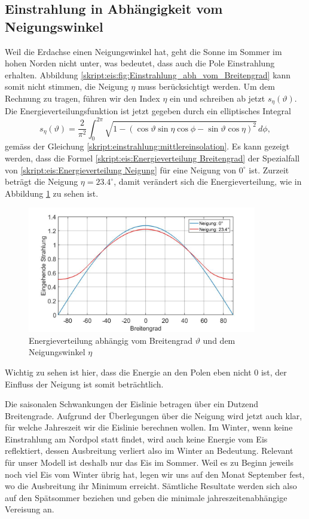 \begin{refsection}
\subsection{Einstrahlung in Abhängigkeit vom Neigungswinkel}
Weil die Erdachse einen Neigungswinkel hat, geht die Sonne im Sommer im hohen Norden nicht unter, was bedeutet, dass auch die Pole Einstrahlung erhalten. Abbildung \ref{skript:eis:fig:Einstrahlung_abh_vom_Breitengrad} kann somit nicht stimmen, die Neigung $\eta$ muss berücksichtigt werden. Um dem Rechnung zu tragen, führen wir den Index $\eta$ ein und schreiben ab jetzt $s_{\eta}(\vartheta)$. Die Energieverteilungsfunktion ist jetzt gegeben durch ein elliptisches Integral
\begin{equation}\label{skript:eis:Energieverteilung Neigung}
s_{\eta}(\vartheta)
=
\frac{2}{\pi^2}\int_{0}^{2\pi}\sqrt{1-(\cos\vartheta\sin\eta \cos\phi-\sin\vartheta \cos\eta)^2}\,d\phi,
\end{equation}
gemäss der Gleichung \eqref{skript:einstrahlung:mittlereinsolation}. Es kann gezeigt werden, dass die Formel \eqref{skript:eis:Energieverteilung Breitengrad} der Spezialfall von \eqref{skript:eis:Energieverteilung Neigung} für eine Neigung von $0^{\circ}$ ist. Zurzeit beträgt die Neigung $\eta=23.4^{\circ}$, damit verändert sich die Energieverteilung, wie in Abbildung \ref{skript:eis:fig:Einstrahlung_abh_mit_und_ohne_Neigung} zu sehen ist.
\begin{figure}
	\centering
	\includegraphics[width=10cm]{eis/Einstrahlung_abh_mit_und_ohne_Neigung.jpg}
	\caption{Energieverteilung abhängig vom Breitengrad $\vartheta$ und dem Neigungswinkel $\eta$}
	\label{skript:eis:fig:Einstrahlung_abh_mit_und_ohne_Neigung}
\end{figure}
Wichtig zu sehen ist hier, dass die Energie an den Polen eben nicht $0$ ist, der Einfluss der Neigung ist somit beträchtlich.

Die saisonalen Schwankungen der Eislinie betragen über ein Dutzend Breitengrade. Aufgrund der Überlegungen über die Neigung wird jetzt auch klar, für welche Jahreszeit wir die Eislinie berechnen wollen. Im Winter, wenn keine Einstrahlung am Nordpol statt findet, wird auch keine Energie vom Eis reflektiert, dessen Ausbreitung verliert also im Winter an Bedeutung. Relevant für unser Modell ist deshalb nur das Eis im Sommer. Weil es zu Beginn jeweils noch viel Eis vom Winter übrig hat, legen wir uns auf den Monat September fest, wo die Ausbreitung ihr Minimum erreicht. Sämtliche Resultate werden sich also auf den Spätsommer beziehen und geben die minimale jahreszeitenabhängige Vereisung an.

\end{refsection}
